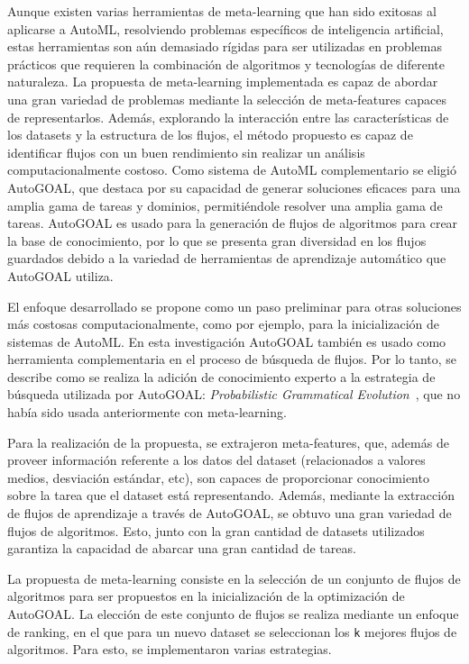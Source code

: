 \begin{conclusions}
Aunque existen varias herramientas de meta-learning que han sido exitosas al aplicarse a AutoML, resolviendo problemas específicos de inteligencia artificial, estas herramientas son aún demasiado rígidas para ser utilizadas en problemas prácticos que requieren la combinación de algoritmos y tecnologías de diferente naturaleza. La propuesta de meta-learning implementada es capaz de abordar una gran variedad de problemas mediante la selección de meta-features capaces de representarlos. Además, explorando la interacción entre las características de los datasets y la estructura de los flujos, el método propuesto es capaz de identificar flujos con un buen rendimiento sin realizar un análisis computacionalmente costoso. Como sistema de AutoML complementario se eligió AutoGOAL, que destaca por su capacidad de generar soluciones eficaces para una amplia gama de tareas y dominios, permitiéndole resolver una amplia gama de tareas. AutoGOAL es usado para la generación de flujos de algoritmos para crear la base de conocimiento, por lo que se presenta gran diversidad en los flujos guardados debido a la variedad de herramientas de aprendizaje automático que AutoGOAL utiliza.

El enfoque desarrollado se propone como un paso preliminar para otras soluciones más costosas computacionalmente, como por ejemplo, para la inicialización de sistemas de AutoML. En esta investigación AutoGOAL también es usado como herramienta complementaria en el proceso de búsqueda de flujos. Por lo tanto, se describe como se realiza la adición de conocimiento experto a la estrategia de búsqueda utilizada por AutoGOAL: \textit{Probabilistic Grammatical Evolution}~\cite{pge2015}, que no había sido usada anteriormente con meta-learning.

Para la realización de la propuesta, se extrajeron meta-features, que, además de proveer información referente a los datos del dataset (relacionados a valores medios, desviación estándar, etc), son capaces de proporcionar conocimiento sobre la tarea que el dataset está representando. Además, mediante la extracción de flujos de aprendizaje a través de AutoGOAL, se obtuvo una gran variedad de flujos de algoritmos. Esto, junto con la gran cantidad de datasets utilizados garantiza la capacidad de abarcar una gran cantidad de tareas.

La propuesta de meta-learning consiste en la selección de un conjunto de flujos de algoritmos para ser propuestos en la inicialización de la optimización de AutoGOAL. La elección de este conjunto de flujos se realiza mediante un enfoque de ranking, en el que para un nuevo dataset se seleccionan los \texttt{k} mejores flujos de algoritmos. Para esto, se implementaron varias estrategias.


\end{conclusions}
